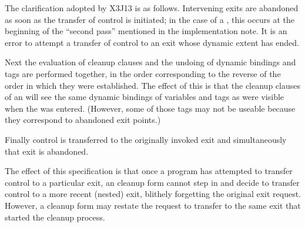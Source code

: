 \begin{defspec}
\begin{newer}
The clarification adopted by X3J13 is as follows.
Intervening exits are abandoned as soon as the transfer of control is initiated;
in the case of a , this occurs at the beginning of the ``second pass''
mentioned in the implementation note.  It is an error to
attempt a transfer of control to an exit whose dynamic extent has
ended.

Next the evaluation of  cleanup clauses and the
undoing of dynamic bindings and  tags are performed together,
in the order corresponding to the reverse of the order
in which they were established.
The effect of this is that the cleanup clauses of an 
will see the same dynamic bindings of variables and  tags as were
visible when the  was entered.  (However, some of those
 tags may not be useable because they correspond to abandoned
exit points.)

Finally  control is transferred to
the originally invoked exit and simultaneously that exit is abandoned.

The effect of this specification is that once a program has attempted
to transfer control to a particular exit, an  cleanup
form cannot
step in and decide to transfer control to a more recent (nested) exit,
blithely forgetting the original exit request.  However, a cleanup form
may restate the request to transfer to the same exit that started
the cleanup process.


\end{newer}
\end{defspec}
